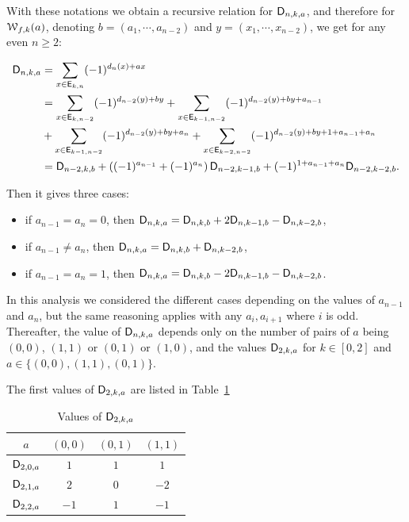 \documentclass[11pt]{llncs}
\begin{document}
With these notations we obtain a recursive relation for $\mathsf{D}_{n,k,a}$, and therefore for $\mathcal{W}_{f,k}(a)$, denoting $b=(a_1,\cdots,a_{n-2})$ and $y=(x_1,\cdots,x_{n-2})$, we get for any even $n\geq 2$:

\begin{align*}
\mathsf{D}_{n,k,a}&=\sum_{x\in \mathsf{E}_{k,n}} (-1)^{d_n(x) +a x}\\
&=\sum_{x\in \mathsf{E}_{k,n-2}} (-1)^{d_{n-2}(y) +b y}+
\sum_{x\in \mathsf{E}_{k-1,n-2}} (-1)^{d_{n-2}(y) +b y + a_{n-1}}\\
&+\sum_{x\in \mathsf{E}_{k-1,n-2}} (-1)^{d_{n-2}(y) +b y + a_{n}}
+\sum_{x\in \mathsf{E}_{k-2,n-2}} (-1)^{d_{n-2}(y) +b y +1 + a_{n-1}+ a_{n}}\\
&=\mathsf{D}_{n-2,k,b}+\left((-1)^{a_{n-1}} + (-1)^{a_{n}}\right)\mathsf{D}_{n-2,k-1,b} + (-1)^{1+a_{n-1}+a_n} \mathsf{D}_{n-2,k-2,b}.
\end{align*}

Then it gives three cases:
\begin{itemize}
	\item if $a_{n-1}=a_n=0$, then $\mathsf{D}_{n,k,a}=\mathsf{D}_{n,k,b}+2\mathsf{D}_{n,k-1,b}-\mathsf{D}_{n,k-2,b}$,
	\item if $a_{n-1} \ne a_n$, then $\mathsf{D}_{n,k,a}=\mathsf{D}_{n,k,b}+\mathsf{D}_{n,k-2,b}$,
	\item if $a_{n-1}=a_n=1$, then $\mathsf{D}_{n,k,a}=\mathsf{D}_{n,k,b}-2\mathsf{D}_{n,k-1,b}-\mathsf{D}_{n,k-2,b}$.
\end{itemize}

In this analysis we considered the different cases depending on the values of $a_{n-1}$ and $a_n$, but the same reasoning applies with any $a_i, a_{i+1}$ where $i$ is odd. 
Thereafter, the value of $\mathsf{D}_{n,k,a}$ depends only on the number of pairs of $a$ being $(0,0)$, $(1,1)$ or $(0,1)$ or $(1,0)$, and the values $\mathsf{D}_{2,k,a}$ for $k \in [0,2]$ and $a\in \{ (0,0),(1,1),(0,1)\}$.

The first values of $\mathsf{D}_{2,k,a}$ are listed in Table~\ref{tab:Dnka}


\begin{table}[H]
	\centering
	\begin{tabular}{|c|c|c|c|}
		\hline
		$a$ & $(0,0)$ & $(0,1)$ & $(1,1)$ \\ \hline
		$\mathsf{D}_{2,0,a}$ &$1$&$1$ & $1$\\ \hline
		$\mathsf{D}_{2,1,a}$ &$2$& $0$ & $-2$\\ \hline
		$\mathsf{D}_{2,2,a}$ &$-1$&$1$ & $-1$\\ \hline
	\end{tabular}
	\caption{Values of $\mathsf{D}_{2,k,a}$}\label{tab:Dnka}
\end{table}
\end{document}
